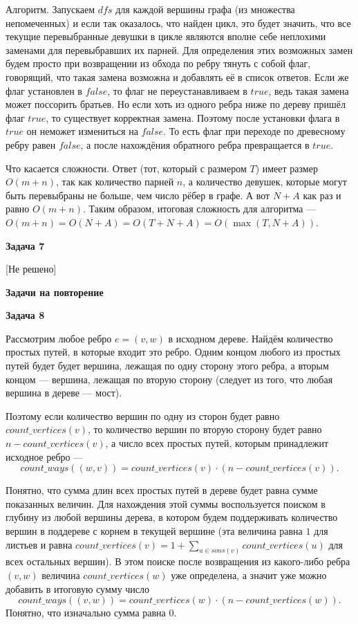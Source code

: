 \documentclass[12pt]{article}
\begin{document}
	Алгоритм. Запускаем	$ dfs $ для каждой вершины графа (из множества непомеченных) и если так оказалось, что найден цикл, это будет значить, что все текущие перевыбранные девушки в цикле являются вполне себе неплохими заменами для перевыбравших их парней. Для определения этих возможных замен будем просто при возвращении из обхода по ребру тянуть с собой флаг, говорящий, что такая замена возможна и добавлять её в список ответов. Если же флаг установлен в $ false $, то флаг не переустанавливаем в $ true $, ведь такая замена может поссорить братьев. Но если хоть из одного ребра ниже по дереву пришёл флаг $ true $, то существует корректная замена. Поэтому после установки флага в $ true $ он неможет измениться на $ false $. То есть флаг при переходе по древесному ребру равен $ false $, а после нахождёния обратного ребра превращается в $ true $.
	
	Что касается сложности. Ответ (тот, который с размером $ T $) имеет размер $ O(m + n) $, так как количество парней $ n $, а количество девушек, которые могут быть перевыбраны не больше, чем число рёбер в графе. А вот $ N + A $ как раз и равно $ O(m + n) $. Таким образом, итоговая сложность для алгоритма --- $ O(m + n) = O(N + A) = O(T + N + A) = O(\max{(T, N + A)}) $.
	\newline
	
	\textbf{\large Задача 7}
	
	[Не решено]
	\newline
	\newline
	
	\textbf{\Large Задачи на повторение}
	\newline
	
	\textbf{\large Задача 8}
	
	Рассмотрим любое ребро $ e = (v, w) $ в исходном дереве.
	Найдём количество простых путей, в которые входит это ребро. Одним концом любого из простых путей будет будет вершина, лежащая по одну сторону этого ребра, а вторым концом --- вершина, лежащая по вторую сторону (следует из того, что любая вершина в дереве --- мост). 
	
	Поэтому если количество вершин по одну из сторон будет равно $ count\_vertices(v) $, то количество вершин по вторую сторону будет равно $ n - count\_vertices(v) $, а число всех простых путей, которым принадлежит исходное ребро --- 
	$$ count\_ways((w, v)) = count\_vertices(v) \cdot (n - count\_vertices(v)). $$
	
	Понятно, что сумма длин всех простых путей в дереве будет равна сумме показанных величин. Для нахождения этой суммы воспользуется поиском в глубину из любой вершины дерева, в котором будем поддерживать количество вершин в поддереве с корнем в текущей вершине (эта величина равна $ 1 $ для листьев и равна $count\_vertices(v) = 1 + \sum\limits_{u \in sons(v)} count\_vertices(u) $ для всех остальных вершин). В этом поиске после возвращения из какого-либо ребра $ (v, w) $ величина $ count\_vertices(w) $ уже определена, а значит уже можно добавить в итоговую сумму число
	$$ count\_ways((v, w)) = count\_vertices(w) \cdot (n - count\_vertices(w)). $$
	Понятно, что изначально сумма равна $ 0 $.
	
\end{document}
